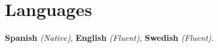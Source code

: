 \documentclass[letterpaper,10pt]{article}
\begin{document}
\section{Languages}
\textbf{Spanish} \emph{(Native)}, \textbf{English} \emph{(Fluent)}, \textbf{Swedish} \emph{(Fluent)}.







\end{document}
